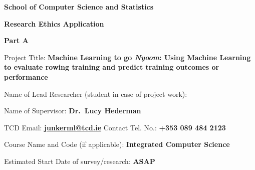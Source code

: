\begin{tcolorbox}
    \begin{center}
        \textbf{\large School of Computer Science and Statistics}

        \textbf{\large Research Ethics Application}
    \end{center}
\end{tcolorbox}
\vspace{0.25cm}

\begin{tcolorbox}
   \begin{center}\textbf{Part A}\end{center}
\end{tcolorbox}

Project Title: \textbf{Machine Learning to go \textit{Nyoom}: Using Machine Learning to evaluate rowing training and predict training outcomes or performance}

Name of Lead Researcher (student in case of project work): \textbf{\authorname}

Name of Supervisor: \textbf{Dr.~Lucy Hederman}

TCD Email: \textbf{\href{mailto:junkerml@tcd.ie}{junkerml@tcd.ie}} Contact Tel. No.: \textbf{+353 089 484 2123}

Course Name and Code (if applicable): \textbf{Integrated Computer Science }

Estimated Start Date of survey/research: \textbf{ASAP}

